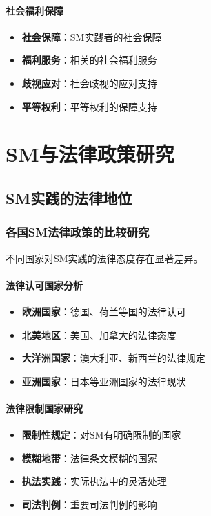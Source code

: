 \documentclass[12pt,UTF8]{ctexbook}
\begin{document}
\subsection{社会福利保障}
\begin{itemize}[leftmargin=2cm]
	\item \textbf{社会保障}：SM实践者的社会保障
	\item \textbf{福利服务}：相关的社会福利服务
	\item \textbf{歧视应对}：社会歧视的应对支持
	\item \textbf{平等权利}：平等权利的保障支持
\end{itemize}

\part{SM与法律政策研究}

\chapter{SM实践的法律地位}
\section{各国SM法律政策的比较研究}
不同国家对SM实践的法律态度存在显著差异。

\subsection{法律认可国家分析}
\begin{itemize}[leftmargin=2cm]
	\item \textbf{欧洲国家}：德国、荷兰等国的法律认可
	\item \textbf{北美地区}：美国、加拿大的法律态度
	\item \textbf{大洋洲国家}：澳大利亚、新西兰的法律规定
	\item \textbf{亚洲国家}：日本等亚洲国家的法律现状
\end{itemize}

\subsection{法律限制国家研究}
\begin{itemize}[leftmargin=2cm]
	\item \textbf{限制性规定}：对SM有明确限制的国家
	\item \textbf{模糊地带}：法律条文模糊的国家
	\item \textbf{执法实践}：实际执法中的灵活处理
	\item \textbf{司法判例}：重要司法判例的影响
\end{itemize}
\end{document}
